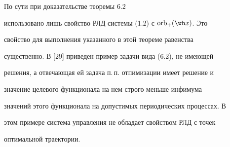 




\begin{notes}


По сути при доказательстве теоремы 6.2


использовано лишь свойство РЛД системы (1.2) с $\orb_+(\wh x)$. Это


свойство для выполнения указанного в этой теореме равенства


существенно. В [29] приведен пример задачи вида (6.2), не имеющей


решения, а отвечающая ей задача п.\,п. отпимизации имеет решение и


значение целевого функционала на нем строго меньше инфимума


значений этого функционала на допустимых периодических процессах. В


этом примере система управления не обладает свойством РЛД с точек


оптимальной траектории.


\end{notes}






